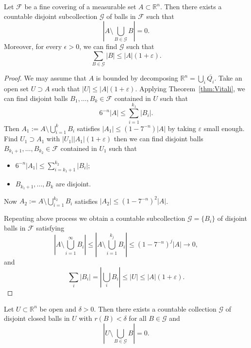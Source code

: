 \begin{theorem}\label{thm:Vitali-meas}
Let $\mathscr{F}$ be a fine covering of a measurable set $A\subset\mathbb{R}^{n}$. Then there exists a countable disjoint subcollection $\mathscr{G}$ of balls in $\mathscr{F}$ such that
$$\left\lvert A\setminus \bigcup_{B\in\mathscr{G}}B \right\rvert =0.$$
Moreover, for every $\epsilon>0$, we can find $\mathscr{G}$ such that
$$
\sum_{B \in \mathscr{G}}\left\vert B \right\vert \leq \left\vert A \right\vert (1+\varepsilon).
$$
\end{theorem}

\begin{proof}
    We may assume that $A$ is bounded by decomposing $\mathbb{R}^{n}=\bigcup_{i} \overline{Q_{i}}$. Take an open set $U \supset A$ such that $\left\vert U \right\vert \le \left\vert A \right\vert (1+\varepsilon)$. Applying Theorem~\ref{thm:Vitali}, we can find disjoint balls $B_1, \ldots ,B_{k}\in \mathscr{F}$ contained in $U$ such that
    $$
    6^{-n}\left\vert A \right\vert \le \sum_{i=1}^{k_1}\left\vert B_{i} \right\vert .
    $$
    Then $A_1:=A\setminus \bigcup_{i=1} ^{k}B_{i}$ satisfies $\left\vert A_1 \right\vert \le (1-7^{-n})\left\vert A \right\vert $ by taking $\varepsilon$ small enough. Find $U_1 \supset A_1$ with $\left\vert U_1 \right\vert \left\vert A_1 \right\vert (1+\varepsilon)$ then we can find disjoint balls $B_{k_1+1}, \ldots ,B_{k_2}\in \mathscr{F}$ contained in $U_1$ such that
    \begin{itemize}
        \item[(1)] $6^{-n}\left\vert A_1 \right\vert \le \sum_{i=k_1+1}^{k_2}\left\vert B_{i} \right\vert $;
        \item[(2)] $B_{k_1+1}, \ldots ,B_{k}$ are disjoint. 
    \end{itemize}
    Now $A_2:=A\setminus \bigcup_{i=1} ^{k_2}B_{i}$ satisfies $\left\vert A_2 \right\vert \le (1-7^{-n})^{2}\left\vert A \right\vert $.

    Repeating above process we obtain a countable subcollection $\mathscr{G}=\{ B_{i} \}$ of disjoint balls in $\mathscr{F}$ satisfying
    $$
    \left\lvert  A\setminus \bigcup _{i=1}^{\infty}B_{i}  \right\rvert \leq \left\lvert  A\setminus \bigcup _{i=1}^{k_{j}}B_{i}  \right\rvert \leq(1-7^{-n})^{j}\lvert A \rvert \to 0,
    $$
    and
    $$\sum _{i}\lvert B_{i} \rvert =\left\lvert  \bigcup _{i}B_{i}  \right\rvert \leq \lvert U \rvert \leq \lvert A \rvert (1+\varepsilon).
    $$
\end{proof}

\begin{corollary}\label{cor:Vitali-open}
Let $U\subset\mathbb{R}^{n}$ be open and $\delta>0$. Then there exists a countable collection $\mathscr{G}$ of disjoint closed balls in $U$ with $r(B)<\delta$ for all $B\in\mathscr{G}$ and
$$|U\setminus \bigcup_{B\in\mathscr{G}}B|=0.
$$
\end{corollary}

